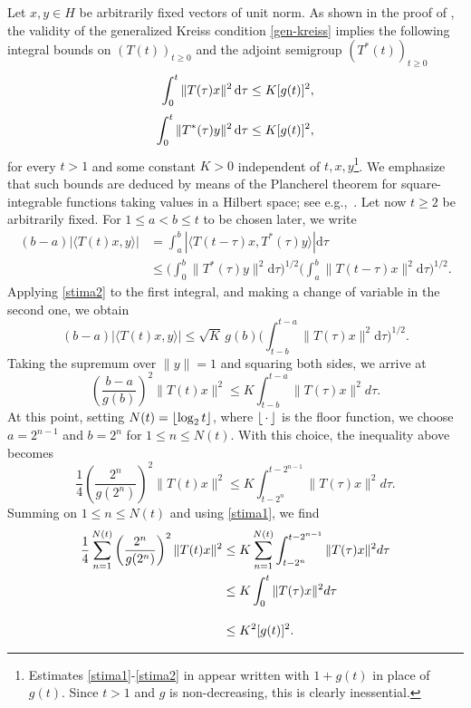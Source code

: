 \documentclass[12pt]{amsart}
\theoremstyle{plain}
\theoremstyle{definition}
\numberwithin{equation}{section}
\DeclarePairedDelimiter\floor{\lfloor}{\rfloor}
\newcommand{\T}{(T(t))_{t\ge 0}}
\begin{document}
\noindent
Let $x,y\in H$ be arbitrarily fixed vectors of unit norm.
As shown in the proof of \cite[Theorem 1.1]{DE}, the validity of the generalized Kreiss
condition \eqref{gen-kreiss} implies the following integral bounds
on $\T$ and the adjoint semigroup $(T^*(t))_{t\ge0}$
\begin{align}
\label{stima1}
\int_{0}^{t}\|T(\tau)x\|^2\, \mathrm{d}\tau \leq K[g(t)]^2,\\
\noalign{\vskip1mm}
\label{stima2}
\int_{0}^{t}\|T^*(\tau)y\|^2\, \mathrm{d}\tau\leq K[g(t)]^2,
\end{align}
for every $t>1$ and some constant $K>0$ independent of $t,x,y$\footnote{Estimates 
\eqref{stima1}-\eqref{stima2} in \cite{DE} appear written with $1+g(t)$ in place of $g(t)$.
Since $t>1$ and $g$ is non-decreasing, this is clearly inessential.}.
We emphasize that
such bounds are deduced by means 
of the Plancherel theorem
for square-integrable functions taking values in a Hilbert space;
see e.g.,\ \cite[Appendix~C]{ENG}.
Let now $t\geq2$ be arbitrarily fixed. For $1\leq a<b\leq t$ to be chosen later, we write
\begin{align*}
(b-a)|\langle T(t) x, y \rangle| &= \int_a^b |\langle T(t-\tau) x, T^*(\tau) y \rangle|\mathrm{d}\tau \\
&\leq
\Big(\int_0^b \| T^*(\tau) y\|^2 \mathrm{d}\tau  \Big)^{1/2}
\Big(\int_a^b \| T(t-\tau) x\|^2 \mathrm{d}\tau  \Big)^{1/2}.
\end{align*}
Applying \eqref{stima2} to the first integral, and making a change of variable in the second one,
we obtain
$$
(b-a)|\langle T(t) x, y \rangle|\leq \sqrt{K}\,g(b)
\bigg(\int_{t-b}^{t-a} \| T(\tau) x\|^2 \mathrm{d}\tau\bigg)^{1/2}.
$$
Taking the supremum over $\|y\|=1$ and squaring both sides, we arrive at
$$
\left(\frac{b-a}{g(b)}\right)^2\|T(t)x\|^2 \leq {K}\int_{t-b}^{t-a}\|T(\tau)x\|^2 d\tau.
$$
At this point, setting $N(t)= \floor*{\log_2 t}$, where $\floor*{\,\cdot\,}$ is the floor function,
we choose $a= 2^{n-1}$ and $b=2^{n}$ for $1\leq n\leq N(t)$. With this choice, the inequality above becomes
$$
\frac{1}{4}\left(\frac{2^n}{g(2^n)}\right)^2 \|T(t)x\|^2 \leq K\int_{t-2^n}^{t-2^{n-1}}\|T(\tau)x\|^2 d\tau.
$$
{Summing on $1\leq n\leq N(t)$} and using \eqref{stima1}, we find
\begin{align}
\label{almost}
\frac{1}{4}\sum_{n=1}^{N(t)}\left(\frac{2^n}{g(2^n)}\right)^2 \|T(t)x\|^2
&\leq K \sum_{n=1}^{N(t)} \int_{t-2^n}^{t-2^{n-1}}\|T(\tau)x\|^2 d\tau\\\nonumber
&\leq  K \int_{0}^{t}\|T(\tau)x\|^2 d\tau\\\noalign{\vskip3.3mm}\nonumber
&\leq K^2[g(t)]^2.
\end{align}
\end{document}

